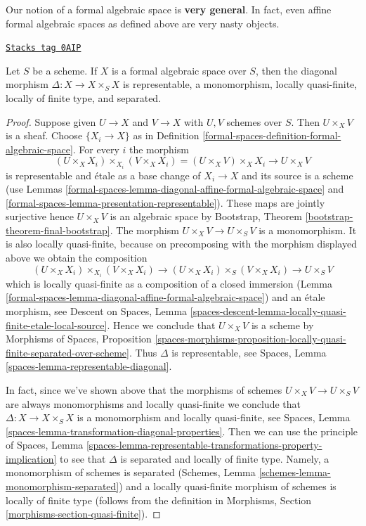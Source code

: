 \medskip\noindent
Our notion of a formal algebraic space is {\bf very general}.
In fact, even affine formal algebraic spaces as defined above
are very nasty objects.

\begin{lemma}
\label{formal-spaces-lemma-diagonal-formal-algebraic-space}
\href{https://stacks.math.columbia.edu/tag/0AIP}{\texttt{Stacks tag 0AIP}}

Let $S$ be a scheme. If $X$ is a formal algebraic space over
$S$, then the diagonal morphism $\Delta : X \to X \times_S X$
is representable, a monomorphism, locally quasi-finite,
locally of finite type, and separated.
\end{lemma}

\begin{proof}
Suppose given $U \to X$ and $V \to X$ with $U, V$ schemes over $S$.
Then $U \times_X V$ is a sheaf. Choose $\{X_i \to X\}$ as in
Definition \ref{formal-spaces-definition-formal-algebraic-space}.
For every $i$ the morphism
$$
(U \times_X X_i) \times_{X_i} (V \times_X X_i)
= (U \times_X V) \times_X X_i \to U \times_X V
$$
is representable and \'etale as a base change of $X_i \to X$
and its source is a scheme (use
Lemmas \ref{formal-spaces-lemma-diagonal-affine-formal-algebraic-space} and
\ref{formal-spaces-lemma-presentation-representable}). These maps are jointly surjective
hence $U \times_X V$ is an algebraic space by
Bootstrap, Theorem \ref{bootstrap-theorem-final-bootstrap}.
The morphism $U \times_X V \to U \times_S V$ is a monomorphism.
It is also locally quasi-finite, because on precomposing with
the morphism displayed above we obtain the composition
$$
(U \times_X X_i) \times_{X_i} (V \times_X X_i)
\to (U \times_X X_i) \times_S (V \times_X X_i)
\to U \times_S V
$$
which is locally quasi-finite as a composition of a closed
immersion (Lemma \ref{formal-spaces-lemma-diagonal-affine-formal-algebraic-space})
and an \'etale morphism, see
Descent on Spaces, Lemma
\ref{spaces-descent-lemma-locally-quasi-finite-etale-local-source}.
Hence we conclude that $U \times_X V$ is a scheme by
Morphisms of Spaces, Proposition
\ref{spaces-morphisms-proposition-locally-quasi-finite-separated-over-scheme}.
Thus $\Delta$ is representable, see
Spaces, Lemma \ref{spaces-lemma-representable-diagonal}.

\medskip\noindent
In fact, since we've shown above that the morphisms of schemes
$U \times_X V \to U \times_S V$ are always monomorphisms and
locally quasi-finite we conclude that $\Delta : X \to X \times_S X$
is a monomorphism and locally quasi-finite, see
Spaces, Lemma \ref{spaces-lemma-transformation-diagonal-properties}.
Then we can use the principle of
Spaces, Lemma
\ref{spaces-lemma-representable-transformations-property-implication}
to see that $\Delta$ is separated and locally of finite type.
Namely, a monomorphism of schemes is separated
(Schemes, Lemma \ref{schemes-lemma-monomorphism-separated})
and a locally quasi-finite morphism of schemes is
locally of finite type
(follows from the definition in
Morphisms, Section \ref{morphisms-section-quasi-finite}).
\end{proof}

